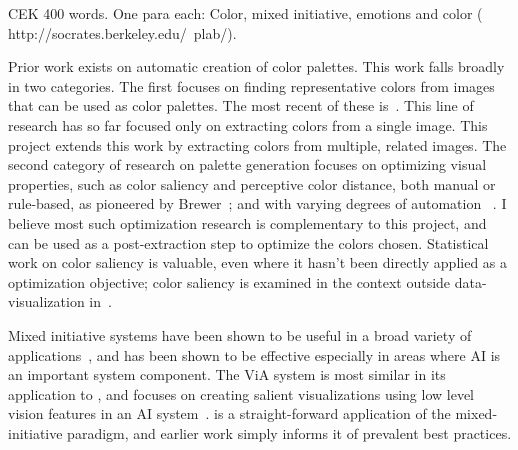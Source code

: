 CEK
400 words. 
One para each: Color, mixed initiative, emotions and color (  http://socrates.berkeley.edu/~plab/).

Prior work exists on automatic creation of color palettes. This work falls broadly in two categories. The first focuses on finding representative  colors from images that can be used as color palettes. The most recent of these is~\cite{morse2007image}. This line of research has so far focused only on extracting colors from a single image. This project extends this work by extracting colors from multiple, related images. The second category of research on palette generation focuses on optimizing visual properties, such as color saliency and perceptive color distance, both manual or rule-based, as pioneered by Brewer~\cite{brewer1999color}; and  with varying degrees of automation ~\cite{healey1996choosing, zeileis2009RGBland}. I believe most such optimization research is complementary to this project, and can be used as a post-extraction step to optimize the colors chosen. Statistical work on color saliency is valuable, even where it hasn't been directly applied as a optimization objective; color saliency is examined in the context outside data-visualization in~\cite{chuang2008probabilistic, benavente2002statistical}. 

Mixed initiative systems have been shown to be useful in a broad variety of applications~\cite{hearst1999mixed}, and has been shown to be effective especially in areas where AI is an important system component. The ViA system is most similar in its application to \system, and focuses on creating salient visualizations using low level vision features in an AI system~\cite{healey2008visual}. \system is a straight-forward application of the mixed-initiative paradigm, and earlier work simply informs it of prevalent best practices.
